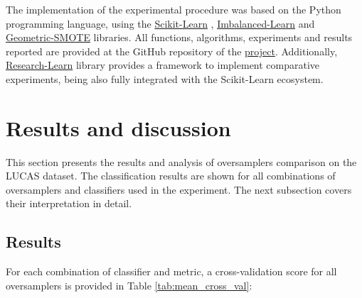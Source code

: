 \documentclass[remotesensing,article,submit,moreauthors,pdftex]{Definitions/mdpi}
\begin{document}
The implementation of the experimental procedure was based on the Python
programming language, using the
\href{https://scikit-learn.org/stable/}{Scikit-Learn} \cite{Pedregosa2011},
\href{https://imbalanced-learn.org/en/stable/}{Imbalanced-Learn} \cite{JMLR:v18:16-365}
and
\href{https://geometric-smote.readthedocs.io/en/latest/?badge=latest}{Geometric-SMOTE}
libraries. All functions, algorithms, experiments and results reported are
provided at the GitHub repository of the
\href{https://github.com/AlgoWit/publications/tree/master/remote-sensing-lucas}{project}.
Additionally,
\href{https://research-learn.readthedocs.io/en/latest/?badge=latest}{Research-Learn}
library provides a framework to implement comparative experiments, being also
fully integrated with the Scikit-Learn ecosystem.

\section{Results and discussion}

This section presents the results and analysis of oversamplers comparison on the
LUCAS dataset. The classification results are shown for all
combinations of oversamplers and classifiers used in the experiment. The next subsection
covers their interpretation in detail.

\subsection{Results}

For each combination of classifier and metric, a cross-validation score for all oversamplers is
provided in Table \ref{tab:mean_cross_val}:

\end{document}
